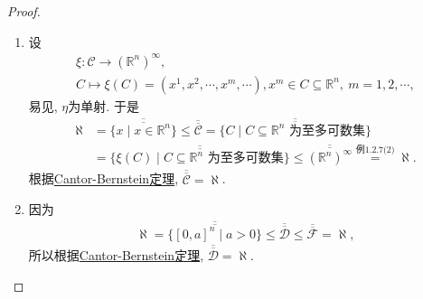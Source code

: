 \documentclass[../../main.tex]{subfiles}%
\begin{document}
\begin{proof}
\begin{enumerate}[(1)]
{\color{blue}证法二:}
设$B \in \mathscr{B}$为只含孤立点的集, 对$B$作由不相交的以有理点为中心, 正有理数为半径的开球, 使得每个这样的开球只含$B$的一个点. 由于这种开球的中心为有理点, 且半径为正有理数, 故这种开球至多可数个. 因而, $B$为至多可数集. 考虑
\begin{gather*}
\xi: \mathscr{B} \to (\mathbb{R}^n)^\infty, \\
B = \{x^1,x^2,\cdots,x^m,\cdots\} \mapsto \xi(B) = (x^1,x^2,\cdots,x^m,\cdots),
\end{gather*}
显然, $\xi$为单射. 且
\begin{align*}
\aleph = \overline{\overline{\{x\mid x \in \mathbb{R}^n\}}} \leqslant \overline{\overline{\mathscr{B}}} = \overline{\overline{\{\xi(B)\mid B \in \mathscr{B}\}}} \leqslant \overline{\overline{(\mathbb{R}^n)^\infty}} = \aleph.
\end{align*}
根据\hyperref[Set Theory-theorem:Cantor-Bernstein定理]{Cantor-Bernstein定理}, $\overline{\overline{\mathscr{B}}}=\aleph$.

\item 设
\begin{gather*}
\xi: \mathscr{C} \to (\mathbb{R}^n)^\infty, \\
C \mapsto \xi(C) = (x^1,x^2,\cdots,x^m,\cdots),x^m \in C \subseteq \mathbb{R}^n,\ m = 1,2,\cdots,
\end{gather*}
易见, $\eta$为单射. 于是
\begin{align*}
\aleph &= \overline{\overline{\{x\mid x \in \mathbb{R}^n\}}} \leqslant \overline{\overline{\mathscr{C}}} = \overline{\overline{\{C\mid C \subseteq \mathbb{R}^n\text{ 为至多可数集}\}}} \\
&= \overline{\overline{\{\xi(C)\mid C \subseteq \mathbb{R}^n\text{ 为至多可数集}\}}} \leqslant \overline{\overline{(\mathbb{R}^n)^\infty}} \stackrel{\text{例1.2.7(2)}}{=} \aleph.
\end{align*}
根据\hyperref[Set Theory-theorem:Cantor-Bernstein定理]{Cantor-Bernstein定理}, $\overline{\overline{\mathscr{C}}}=\aleph$.

\item 因为
\begin{align*}
\aleph = \overline{\overline{\{[0,a]^n\mid a > 0\}}} \leqslant \overline{\overline{\mathscr{D}}} \leqslant \overline{\overline{\mathscr{F}}} = \aleph,
\end{align*}
所以根据\hyperref[Set Theory-theorem:Cantor-Bernstein定理]{Cantor-Bernstein定理}, $\overline{\overline{\mathscr{D}}}=\aleph$.
\end{enumerate}
\end{proof}
\end{document}
